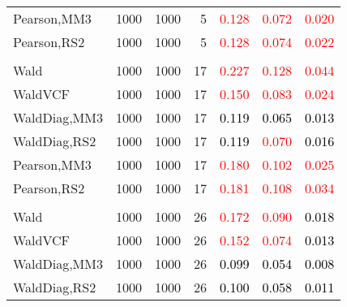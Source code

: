 \documentclass[
]{article}
\begin{document}
\begin{table}[H]
{\begin{tabular}[t]{lrrrrrr}
\hspace{1em}Pearson,MM3 & 1000 & 1000 & 5 & \textcolor{red}{0.128} & \textcolor{red}{0.072} & \textcolor{red}{0.020}\\
\hspace{1em}Pearson,RS2 & 1000 & 1000 & 5 & \textcolor{red}{0.128} & \textcolor{red}{0.074} & \textcolor{red}{0.022}\\
\addlinespace[0.3em]
\multicolumn{7}{l}{\textbf{1F 15V}}\\
\hspace{1em}Wald & 1000 & 1000 & 17 & \textcolor{red}{0.227} & \textcolor{red}{0.128} & \textcolor{red}{0.044}\\
\hspace{1em}WaldVCF & 1000 & 1000 & 17 & \textcolor{red}{0.150} & \textcolor{red}{0.083} & \textcolor{red}{0.024}\\
\hspace{1em}WaldDiag,MM3 & 1000 & 1000 & 17 & \textcolor{black}{0.119} & \textcolor{black}{0.065} & \textcolor{black}{0.013}\\
\hspace{1em}WaldDiag,RS2 & 1000 & 1000 & 17 & \textcolor{black}{0.119} & \textcolor{red}{0.070} & \textcolor{black}{0.016}\\
\hspace{1em}Pearson,MM3 & 1000 & 1000 & 17 & \textcolor{red}{0.180} & \textcolor{red}{0.102} & \textcolor{red}{0.025}\\
\hspace{1em}Pearson,RS2 & 1000 & 1000 & 17 & \textcolor{red}{0.181} & \textcolor{red}{0.108} & \textcolor{red}{0.034}\\
\addlinespace[0.3em]
\multicolumn{7}{l}{\textbf{2F 10V}}\\
\hspace{1em}Wald & 1000 & 1000 & 26 & \textcolor{red}{0.172} & \textcolor{red}{0.090} & \textcolor{black}{0.018}\\
\hspace{1em}WaldVCF & 1000 & 1000 & 26 & \textcolor{red}{0.152} & \textcolor{red}{0.074} & \textcolor{black}{0.013}\\
\hspace{1em}WaldDiag,MM3 & 1000 & 1000 & 26 & \textcolor{black}{0.099} & \textcolor{black}{0.054} & \textcolor{black}{0.008}\\
\hspace{1em}WaldDiag,RS2 & 1000 & 1000 & 26 & \textcolor{black}{0.100} & \textcolor{black}{0.058} & \textcolor{black}{0.011}\\

\end{tabular}}
\end{table}
\end{document}
